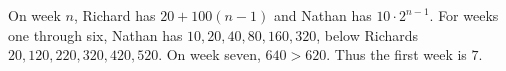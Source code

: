 On week $n$, Richard has $20+100(n-1)$ and Nathan has $10\cdot 2^{n-1}$. For weeks one through six, Nathan has $10,20,40,80,160,320$, below Richards $20,120,220,320,420,520$. On week seven, $640>620$. Thus the first week is $\boxed 7$.
